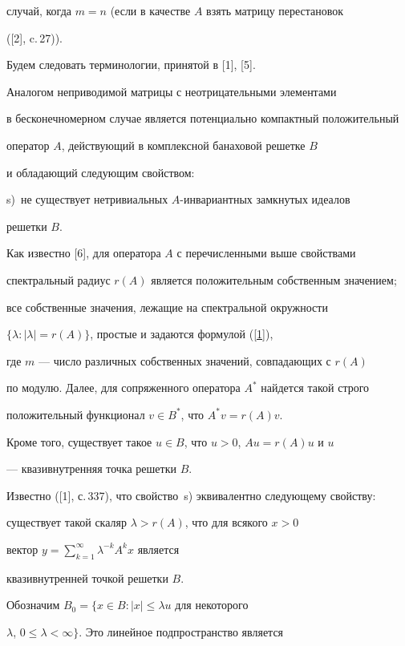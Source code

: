 случай, когда $m = n$ (если в качестве $A$ взять матрицу перестановок


([2], c.\,27)).





Будем следовать терминологии, принятой в [1], [5].





Аналогом неприводимой матрицы с неотрицательными элементами 


в бесконечномерном случае является потенциально компактный положительный


оператор $A$, действующий в комплексной банаховой решетке $B$


и обладающий следующим свойством:


s)~не существует нетривиальных $A$-инвариантных замкнутых идеалов


решетки $B$.


Как известно [6], для оператора $A$ с перечисленными выше свойствами 


спектральный радиус $r(A)$ является положительным собственным значением;


все собственные значения, лежащие на спектральной окружности


$\{\lambda: |\lambda| = r(A)\}$, простые и задаются формулой (\ref{1}),


где $m$ --- число различных собственных значений, совпадающих с $r(A)$


по модулю. Далее, для сопряженного оператора $A^*$ найдется такой строго


положительный функционал $v\in B^*$, что $A^*v = r(A)v$.


Кроме того, существует такое $u\in B$, что $u > 0$, $Au = r(A)u$ и $u$ 


--- квазивнутренняя точка решетки $B$.


Известно ([1], с.\,337), что свойство~s) эквивалентно следующему свойству:


существует такой скаляр $\lambda > r(A)$, что для всякого $x > 0$


вектор $y = \sum\limits_{k=1}^\infty \lambda^{-k}A^k x$ является


квазивнутренней точкой решетки $B$.





Обозначим $B_0 = \{x\in B : |x| \le \lambda u$ для некоторого


$\lambda$, $0 \le \lambda < \infty\}$. Это линейное подпространство является


